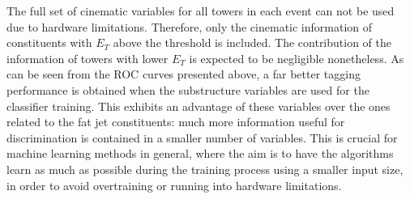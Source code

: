 \documentclass[main]{subfiles} %
\begin{document}
The full set of cinematic variables for all towers in each event can not be used due to hardware limitations. Therefore, only the cinematic information of constituents with $E_T$ above the threshold is included. The contribution of the information of towers with lower $E_T$ is expected to be negligible nonetheless. As can be seen from the ROC curves presented above, a far better tagging performance is obtained when the substructure variables are used for the classifier training. This exhibits an advantage of these variables over the ones related to the fat jet constituents: much more information useful for discrimination is contained in a smaller number of variables. This is crucial for machine learning methods in general, where the aim is to have the algorithms learn as much as possible during the training process using a smaller input size, in order to avoid overtraining or running into hardware limitations. 

















\biblio
\end{document}
